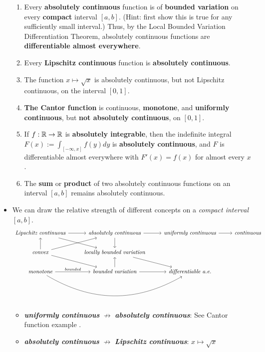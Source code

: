 \documentclass[11pt]{article}
\begin{document}
\begin{itemize}
\begin{proposition}
\begin{enumerate}
\item Every \textbf{absolutely continuous} function is of \textbf{bounded variation} on every \textbf{compact} interval $[a, b]$. (Hint: first show this is true for any sufficiently small interval.) Thus, by the Local Bounded Variation Differentiation Theorem, absolutely continuous functions are \textbf{differentiable almost everywhere}.

\item Every \textbf{Lipschitz continuous} function is \textbf{absolutely continuous}.

\item The function $x \mapsto \sqrt{x}$ is absolutely continuous, but not Lipschitz continuous, on the interval $[0, 1]$.

\item \textbf{The Cantor function} is continuous, \textbf{monotone}, and \textbf{uniformly continuous}, but \textbf{not absolutely continuous}, on $[0, 1]$.

\item  If $f: {\mathbb R} \rightarrow {\mathbb R}$ is \textbf{absolutely integrable}, then the indefinite integral $F(x) := \int_{[-\infty,x]} f(y) dy$ is \textbf{absolutely continuous}, and $F$ is differentiable almost everywhere with $F'(x) = f(x)$ for almost every $x$.

\item The \textbf{sum} or \textbf{product} of two absolutely continuous functions on an interval $[a, b]$ remains absolutely continuous.
\end{enumerate}
\end{proposition}

\item \begin{remark}
We can draw the relative strength of different concepts on a \emph{compact interval} $[a, b]$.
\[
  \begin{tikzcd}
     \text{\emph{Lipschitz continuous}} \arrow{r}{}  \arrow{dr}{} & \text{\emph{absolutely continuous}} \arrow{d}{} \arrow{r}{} &  \text{\emph{uniformly continuous}}  \arrow{r}{}  &\text{\emph{continuous}} \\
     \text{\emph{convex}} \arrow{u}{} \arrow{ur}{}  \arrow{dr}{} & \text{\emph{locally bounded variation}} \arrow{dr}{} & & \\
\text{\emph{monotone}}  \arrow[rr, bend right]   \arrow{r}{\text{\emph{bounded}}}   & \text{\emph{bounded variation}}  \arrow{u}{} \arrow{r}{} & \text{\emph{differentiable a.e.}} &
  \end{tikzcd}
\] 
\begin{itemize}
\item \emph{\textbf{uniformly continuous}} $\not\rightarrow$ \emph{\textbf{absolutely continuous}}: See Cantor function example \citep{tao2011introduction}.
\item  \emph{\textbf{absolutely continuous}} $\not\rightarrow$ \emph{\textbf{Lipschitz continuous}}: $x \mapsto \sqrt{x}$
\end{itemize}
\end{remark}


\end{itemize}
\end{document}
